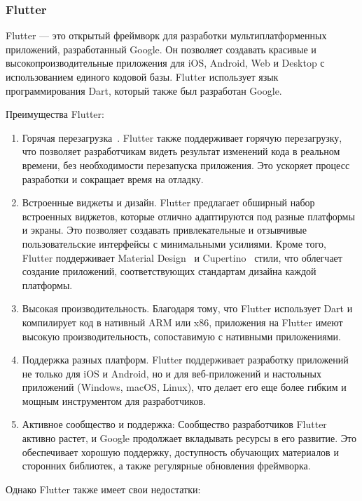 \documentclass[14pt, russian]{scrartcl}
\begin{document}
\subsubsection{Flutter}\label{sect:flutter}

Flutter --- это открытый фреймворк для разработки мультиплатформенных приложений, разработанный Google. Он позволяет создавать красивые и высокопроизводительные приложения для iOS, Android, Web и Desktop с использованием единого кодовой базы. Flutter использует язык программирования Dart, который также был разработан Google.

Преимущества Flutter:

\begin{enumerate}
    \item Горячая перезагрузка~\cite{FlutterHotReload}. Flutter также поддерживает горячую перезагрузку, что позволяет разработчикам видеть результат изменений кода в реальном времени, без необходимости перезапуска приложения. Это ускоряет процесс разработки и сокращает время на отладку.
    \item Встроенные виджеты и дизайн. Flutter предлагает обширный набор встроенных виджетов, которые отлично адаптируются под разные платформы и экраны. Это позволяет создавать привлекательные и отзывчивые пользовательские интерфейсы с минимальными усилиями. Кроме того, Flutter поддерживает Material Design~\cite{FlutterMaterial} и Cupertino~\cite{FlutterCupertino} стили, что облегчает создание приложений, соответствующих стандартам дизайна каждой платформы.
    \item Высокая производительность. Благодаря тому, что Flutter использует Dart и компилирует код в нативный ARM или x86, приложения на Flutter имеют высокую производительность, сопоставимую с нативными приложениями.
    \item Поддержка разных платформ. Flutter поддерживает разработку приложений не только для iOS и Android, но и для веб-приложений и настольных приложений (Windows, macOS, Linux), что делает его еще более гибким и мощным инструментом для разработчиков.
    \item Активное сообщество и поддержка: Сообщество разработчиков Flutter активно растет, и Google продолжает вкладывать ресурсы в его развитие. Это обеспечивает хорошую поддержку, доступность обучающих материалов и сторонних библиотек, а также регулярные обновления фреймворка.
\end{enumerate}

Однако Flutter также имеет свои недостатки:
\end{document}
